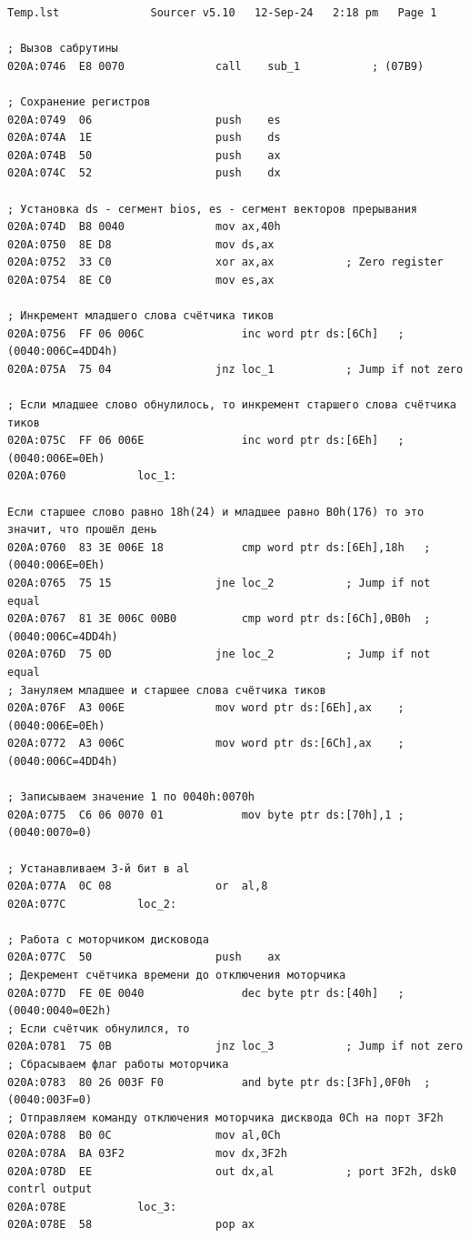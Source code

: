 \documentclass[a4paper,14pt]{article}
\begin{document}
	\begin{lstlisting}[style={asm}]
      Temp.lst				Sourcer	v5.10   12-Sep-24   2:18 pm   Page 1

; Вызов сабрутины
020A:0746  E8 0070				call	sub_1			; (07B9)

; Сохранение регистров
020A:0749  06					push	es
020A:074A  1E					push	ds
020A:074B  50					push	ax
020A:074C  52					push	dx

; Установка ds - сегмент bios, es - сегмент векторов прерывания
020A:074D  B8 0040				mov	ax,40h
020A:0750  8E D8				mov	ds,ax
020A:0752  33 C0				xor	ax,ax			; Zero register
020A:0754  8E C0				mov	es,ax

; Инкремент младшего слова счётчика тиков
020A:0756  FF 06 006C				inc	word ptr ds:[6Ch]	; (0040:006C=4DD4h)
020A:075A  75 04				jnz	loc_1			; Jump if not zero

; Если младшее слово обнулилось, то инкремент старшего слова счётчика тиков
020A:075C  FF 06 006E				inc	word ptr ds:[6Eh]	; (0040:006E=0Eh)
020A:0760			loc_1:

Если старшее слово равно 18h(24) и младшее равно B0h(176) то это значит, что прошёл день
020A:0760  83 3E 006E 18			cmp	word ptr ds:[6Eh],18h	; (0040:006E=0Eh)
020A:0765  75 15				jne	loc_2			; Jump if not equal
020A:0767  81 3E 006C 00B0			cmp	word ptr ds:[6Ch],0B0h	; (0040:006C=4DD4h)
020A:076D  75 0D				jne	loc_2			; Jump if not equal
; Зануляем младшее и старшее слова счётчика тиков
020A:076F  A3 006E				mov	word ptr ds:[6Eh],ax	; (0040:006E=0Eh)
020A:0772  A3 006C				mov	word ptr ds:[6Ch],ax	; (0040:006C=4DD4h)

; Записываем значение 1 по 0040h:0070h
020A:0775  C6 06 0070 01			mov	byte ptr ds:[70h],1	; (0040:0070=0)

; Устанавливаем 3-й бит в al
020A:077A  0C 08				or	al,8
020A:077C			loc_2:

; Работа с моторчиком дисковода
020A:077C  50					push	ax
; Декремент счётчика времени до отключения моторчика
020A:077D  FE 0E 0040				dec	byte ptr ds:[40h]	; (0040:0040=0E2h)
; Если счётчик обнулился, то
020A:0781  75 0B				jnz	loc_3			; Jump if not zero
; Сбрасываем флаг работы моторчика
020A:0783  80 26 003F F0			and	byte ptr ds:[3Fh],0F0h	; (0040:003F=0)
; Отправляем команду отключения моторчика дисквода 0Ch на порт 3F2h
020A:0788  B0 0C				mov	al,0Ch
020A:078A  BA 03F2				mov	dx,3F2h
020A:078D  EE					out	dx,al			; port 3F2h, dsk0 contrl output
020A:078E			loc_3:
020A:078E  58					pop	ax


\end{lstlisting}
\end{document}
